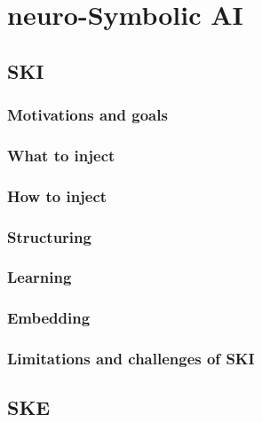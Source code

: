 
\chapter{neuro-Symbolic AI}
\label{ch:nesy-ai}

\section{\Acl{SKI}}\label{sec:ski}

\subsection{Motivations and goals}\label{subsec:ski-motivations-and-goals}

\subsection{What to inject}\label{subsec:what-to-inject}

\subsection{How to inject}\label{subsec:how-to-inject}

\subsection{Structuring}\label{subsec:structuring}

\subsection{Learning}\label{subsec:learning}

\subsection{Embedding}\label{subsec:ski-embedding}

\subsection{Limitations and challenges of \ac{SKI}}\label{subsec:limitations-and-challenges-of-ski}

\section{\Acl{SKE}}\label{sec:ske}


